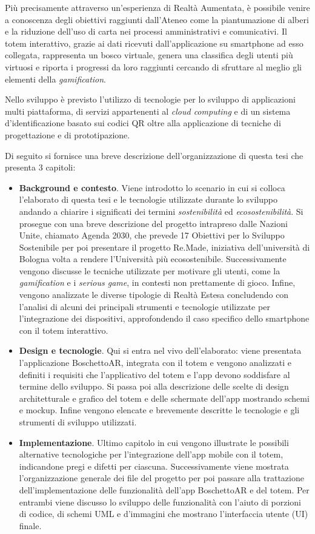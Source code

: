 Più precisamente attraverso un'esperienza di Realtà Aumentata, è possibile venire a conoscenza degli obiettivi raggiunti dall'Ateneo come la piantumazione di alberi e la riduzione dell'uso di carta nei processi amministrativi e comunicativi.
Il totem interattivo, grazie ai dati ricevuti dall'applicazione su smartphone ad esso collegata, rappresenta un bosco virtuale, genera una classifica degli utenti più virtuosi e riporta i progressi da loro raggiunti cercando di sfruttare al meglio gli elementi della \textit{gamification}.
\vspace{10pt}

Nello sviluppo è previsto l'utilizzo di tecnologie per lo sviluppo di applicazioni multi piattaforma, di servizi appartenenti al \textit{cloud computing} e di un sistema d'identificazione basato sui codici QR oltre alla applicazione di tecniche di progettazione e di prototipazione.

Di seguito si fornisce una breve descrizione dell'organizzazione di questa tesi che presenta 3 capitoli: 
\begin{itemize}
    \itemsep1em
    \item \textbf{Background e contesto}. Viene introdotto lo scenario in cui si colloca l'elaborato di questa tesi e le tecnologie utilizzate durante lo sviluppo andando a chiarire i significati dei termini \textit{sostenibilità} ed \textit{ecosostenibilità}. Si prosegue con una breve descrizione del progetto intrapreso dalle Nazioni Unite, chiamato Agenda 2030, che prevede 17 Obiettivi per lo Sviluppo Sostenibile per poi presentare il progetto Re.Made, iniziativa dell'università di Bologna volta a rendere l'Università più ecosostenibile.
    Successivamente vengono discusse le tecniche utilizzate per motivare gli utenti, come la \textit{gamification} e i \textit{serious game}, in contesti non prettamente di gioco. Infine, vengono analizzate le diverse tipologie di Realtà Estesa concludendo con l'analisi di alcuni dei principali strumenti e tecnologie utilizzate per l'integrazione dei dispositivi, approfondendo il caso specifico dello smartphone con il totem interattivo.
    \item \textbf{Design e tecnologie}. Qui si entra nel vivo dell'elaborato: viene presentata l'applicazione BoschettoAR, integrata con il totem e vengono analizzati e definiti i requisiti che l'applicativo del totem e l'app devono soddisfare al termine dello sviluppo. Si passa poi alla descrizione delle scelte di design architetturale e grafico del totem e delle schermate dell'app mostrando schemi e mockup. Infine vengono elencate e brevemente descritte le tecnologie e gli strumenti di sviluppo utilizzati.
    \item \textbf{Implementazione}. Ultimo capitolo in cui vengono illustrate le possibili alternative tecnologiche per l'integrazione dell'app mobile con il totem, indicandone pregi e difetti per ciascuna. Successivamente viene mostrata l'organizzazione generale dei file del progetto per poi passare alla trattazione dell'implementazione delle funzionalità dell'app BoschettoAR e del totem.
    Per entrambi viene discusso lo sviluppo delle funzionalità con l'aiuto di porzioni di codice, di schemi UML e d'immagini che mostrano l'interfaccia utente (UI) finale.
\end{itemize}